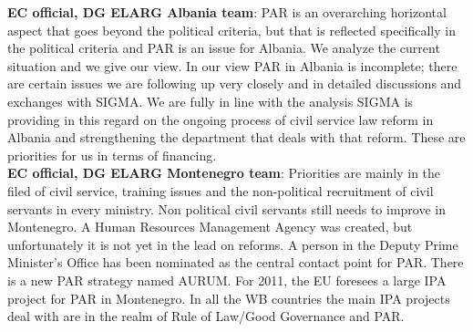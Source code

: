 \textbf{EC official, DG ELARG Albania team}: PAR is an overarching horizontal aspect that goes beyond the political criteria, but that is reflected specifically in the political criteria and PAR is an issue for Albania. We analyze the current situation and we give our view. In our view PAR in Albania is incomplete; there are certain issues we are following up very closely and in detailed discussions and exchanges with SIGMA. We are fully in line with the analysis SIGMA is providing in this regard on the ongoing process of civil service law reform in Albania and strengthening the department that deals with that reform. These are priorities for us in terms of financing.\\
\textbf{EC official, DG ELARG Montenegro team}: Priorities are mainly in the filed of civil service, training issues and the non-political recruitment of civil servants in every ministry. Non political civil servants still needs to improve in Montenegro. A Human Resources Management Agency was created, but unfortunately it is not yet in the lead on reforms. A person in the Deputy Prime Minister's Office has been nominated as the central contact point for PAR. There is a new PAR strategy named AURUM. For 2011, the EU foresees a large IPA project for PAR in Montenegro. In all the WB countries the main IPA projects deal with are in the realm of Rule of Law/Good Governance and PAR. \\
